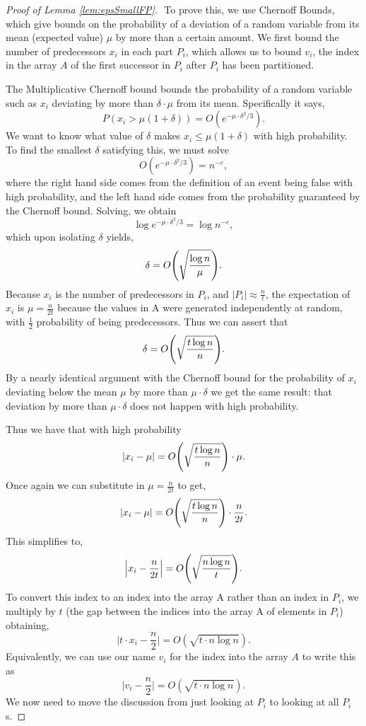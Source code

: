 \documentclass[11pt]{article}
\DeclarePairedDelimiter{\paren}{(}{)}
\renewcommand{\paragraph}[1]{\vspace{0.09in}\noindent{\bf \boldmath #1.}}
\theoremstyle{remark}
\theoremstyle{remark}
\begin{document}
\begin{proof}[Proof of Lemma \ref{lem:epsSmallFP}]
$ $\newline
\paragraph{A Single $P_i$}
To prove this, we use Chernoff Bounds, which give bounds on the probability of a deviation of a random variable from its mean (expected value) $\mu$ by more than a certain amount.
We first bound the number of predecessors $x_i$ in each part $P_i$, which allows us to bound $v_i$, the index in the array $A$ of the first successor in $P_i$ after $P_i$ has been partitioned.

The Multiplicative Chernoff bound bounds the probability of a random variable such as $x_i$ deviating by more than $\delta \cdot \mu$ from its mean.
Specifically it says,
$$P(x_i>\mu(1+\delta)) = O(e^{-\mu \cdot \delta^2/3}).$$
We want to know what value of $\delta$ makes $x_i\leq\mu(1+\delta)$ with high probability.
To find the smallest $\delta$ satisfying this, we must solve 
$$O(e^{-\mu \cdot \delta^2/3}) = n^{-c},$$
where the right hand side comes from the definition of an event being false with high probability, and the left hand side comes from the probability guaranteed by the Chernoff bound.
Solving, we obtain 
$$\log e^{-\mu \cdot \delta^2/3} = \log n^{-c},$$
which upon isolating $\delta$ yields,
$$\delta = O\paren*{\sqrt{\frac{\log n}{\mu}}}.$$
Because $x_i$ is the number of predecessors in $P_i$, and $|P_i| \approx \frac{n}{t}$, the expectation of $x_i$ is $\mu = \frac{n}{2t}$ because the values in A were generated independently at random, with $\frac{1}{2}$ probability of being predecessors.
Thus we can assert that 
$$\delta = O\paren*{\sqrt{\frac{t\log n}{n}}}.$$
By a nearly identical argument with the Chernoff bound for the probability of $x_i$ deviating below the mean $\mu$ by more than $\mu \cdot \delta$ we get the same result: that deviation by more than $\mu \cdot \delta$ does not happen with high probability.

Thus we have that with high probability
$$|x_i - \mu| = O\paren*{\sqrt{\frac{t\log n}{n}}} \cdot \mu.$$
Once again we can substitute in $\mu=\frac{n}{2t}$ to get,
$$|x_i - \mu| = O\paren*{\sqrt{\frac{t\log n}{n}}} \cdot \frac{n}{2t}.$$
This simplifies to,
$$\Big|x_i - \frac{n}{2t}\Big| = O\paren*{\sqrt{\frac{n\log n}{t}}}.$$
To convert this index to an index into the array A rather than an index in $P_i$, we multiply by $t$ (the gap between the indices into the array A of elements in $P_i$) obtaining,
$$\Big|t\cdot x_i - \frac{n}{2}\Big| = O(\sqrt{t\cdot n\log n}).$$
Equivalently, we can use our name $v_i$ for the index into the array $A$ to write this as
$$\Big|v_i - \frac{n}{2}\Big| = O(\sqrt{t\cdot n\log n}).$$
We now need to move the discussion from just looking at $P_i$ to looking at all $P_i$s.


\end{proof}
\end{document}
